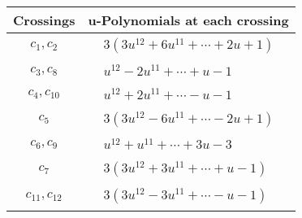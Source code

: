 \documentclass[1p]{elsarticle_modified}
\theoremstyle{definition}
\begin{document}
\begin{tabular}{m{50pt}|m{274pt}}
Crossings & \hspace{64pt}u-Polynomials at each crossing \\
\hline $$\begin{aligned}c_{1},c_{2}\end{aligned}$$&$\begin{aligned}
&3(3 u^{12}+6 u^{11}+\cdots+2 u+1)
\end{aligned}$\\
\hline $$\begin{aligned}c_{3},c_{8}\end{aligned}$$&$\begin{aligned}
&u^{12}-2 u^{11}+\cdots+u-1
\end{aligned}$\\
\hline $$\begin{aligned}c_{4},c_{10}\end{aligned}$$&$\begin{aligned}
&u^{12}+2 u^{11}+\cdots- u-1
\end{aligned}$\\
\hline $$\begin{aligned}c_{5}\end{aligned}$$&$\begin{aligned}
&3(3 u^{12}-6 u^{11}+\cdots-2 u+1)
\end{aligned}$\\
\hline $$\begin{aligned}c_{6},c_{9}\end{aligned}$$&$\begin{aligned}
&u^{12}+u^{11}+\cdots+3 u-3
\end{aligned}$\\
\hline $$\begin{aligned}c_{7}\end{aligned}$$&$\begin{aligned}
&3(3 u^{12}+3 u^{11}+\cdots+u-1)
\end{aligned}$\\
\hline $$\begin{aligned}c_{11},c_{12}\end{aligned}$$&$\begin{aligned}
&3(3 u^{12}-3 u^{11}+\cdots- u-1)
\end{aligned}$\\
\hline
\end{tabular}\\~\\
\newpage\renewcommand{\arraystretch}{1}
\end{document}
